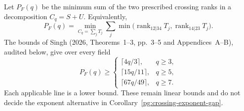 \begin{proposition}
\label{pg:singh-crossing}
Let $P_F(q)$ be the minimum sum of the two prescribed crossing
ranks in a decomposition $C_q=S+U$. Equivalently,
\[
 P_F(q)=\min_{C_q=\sum_jT_j}
 \sum_j\min\bigl(\operatorname{rank}_{12|34}T_j,
                 \operatorname{rank}_{14|23}T_j\bigr).
\]
The bounds of Singh (2026, Theorems~1--3, pp.~3--5 and
Appendices~A--B), audited below, give over every field
\[
 P_F(q)\geq
 \begin{cases}
 \lceil4q/3\rceil,&q\geq3,\\
 \lceil15q/11\rceil,&q\geq5,\\
 \lceil67q/49\rceil,&q\geq7.
 \end{cases}
 \tag{PG-SINGH-bounds}
\]
Each applicable line is a lower bound. These remain linear
bounds and do not decide the exponent alternative in
Corollary~\ref{pg:crossing-exponent-gap}.
\end{proposition}
